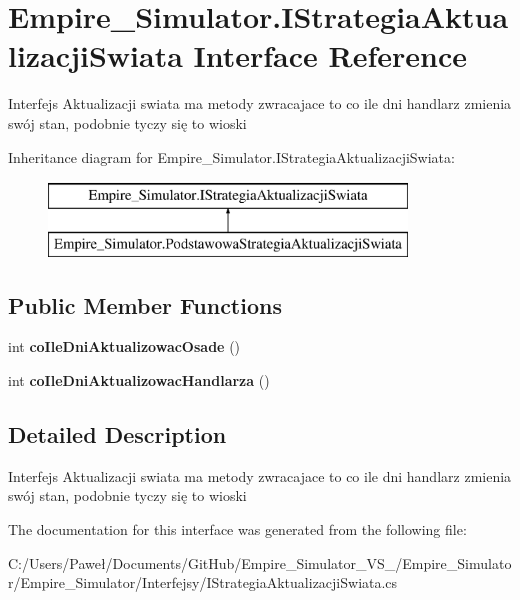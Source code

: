\hypertarget{interface_empire___simulator_1_1_i_strategia_aktualizacji_swiata}{\section{Empire\+\_\+\+Simulator.\+I\+Strategia\+Aktualizacji\+Swiata Interface Reference}
\label{interface_empire___simulator_1_1_i_strategia_aktualizacji_swiata}
}


Interfejs Aktualizacji swiata ma metody zwracajace to co ile dni handlarz zmienia swój stan, podobnie tyczy się to wioski  


Inheritance diagram for Empire\+\_\+\+Simulator.\+I\+Strategia\+Aktualizacji\+Swiata\+:\begin{figure}[H]
\begin{center}
\leavevmode
\includegraphics[height=2.000000cm]{interface_empire___simulator_1_1_i_strategia_aktualizacji_swiata}
\end{center}
\end{figure}
\subsection*{Public Member Functions}
\begin{DoxyCompactItemize}
\item 
\hypertarget{interface_empire___simulator_1_1_i_strategia_aktualizacji_swiata_a449765a9f768f9a3a4412aff2f1a2b51}{int {\bfseries co\+Ile\+Dni\+Aktualizowac\+Osade} ()}\label{interface_empire___simulator_1_1_i_strategia_aktualizacji_swiata_a449765a9f768f9a3a4412aff2f1a2b51}

\item 
\hypertarget{interface_empire___simulator_1_1_i_strategia_aktualizacji_swiata_a2378bb4f6e915e985e7dfbeb8d9662ec}{int {\bfseries co\+Ile\+Dni\+Aktualizowac\+Handlarza} ()}\label{interface_empire___simulator_1_1_i_strategia_aktualizacji_swiata_a2378bb4f6e915e985e7dfbeb8d9662ec}

\end{DoxyCompactItemize}


\subsection{Detailed Description}
Interfejs Aktualizacji swiata ma metody zwracajace to co ile dni handlarz zmienia swój stan, podobnie tyczy się to wioski 



The documentation for this interface was generated from the following file\+:\begin{DoxyCompactItemize}
\item 
C\+:/\+Users/\+Paweł/\+Documents/\+Git\+Hub/\+Empire\+\_\+\+Simulator\+\_\+\+V\+S\+\_/\+Empire\+\_\+\+Simulator/\+Empire\+\_\+\+Simulator/\+Interfejsy/I\+Strategia\+Aktualizacji\+Swiata.\+cs\end{DoxyCompactItemize}
